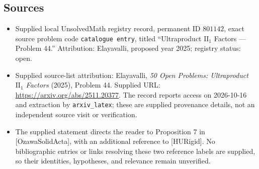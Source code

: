 \documentclass[11pt]{article}
\begin{document}
\subsection{Sources}
\begin{itemize}
\item Supplied local UnsolvedMath registry record, permanent ID \(801142\), exact source problem code \texttt{catalogue entry}, titled ``Ultraproduct \(\mathrm{II}_1\) Factors --- Problem 44.'' Attribution: Elayavalli, proposed year 2025; registry status: open.
\item Supplied source-list attribution: Elayavalli, \emph{50 Open Problems: Ultraproduct \(\mathrm{II}_1\) Factors} (2025), Problem 44. Supplied URL: \url{https://arxiv.org/abs/2511.20377}. The record reports access on 2026-10-16 and extraction by \texttt{arxiv\_latex}; these are supplied provenance details, not an independent source visit or verification.
\item The supplied statement directs the reader to Proposition 7 in [OzawaSolidActa], with an additional reference to [HURigid]. No bibliographic entries or links resolving these two reference labels are supplied, so their identities, hypotheses, and relevance remain unverified.
\end{itemize}
\end{document}
